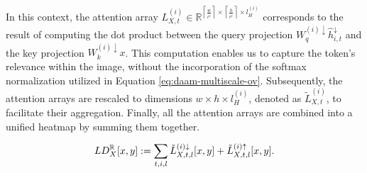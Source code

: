 In this context, the attention array $L_{X,t}^{(i)}\in \mathbb{R}^{\left \lceil \frac{w}{c^i} \right \rceil \times \left \lceil \frac{h}{c^i} \right \rceil \times l_{H}^{(i)}}$ corresponds to the result of computing the dot product between the query projection $W_q^{(i)\downarrow} \hat{h}_{i, t}^{\downarrow}$ and the key projection $W_k^{(i)\downarrow} x$. This computation enables us to capture the token's relevance within the image, without the incorporation of the softmax normalization utilized in Equation \ref{eq:daam-multiscale-ov}.
Subsequently, the attention arrays are rescaled to dimensions $w \times h \times l_{H}^{(i)}$, denoted as $\tilde{L}_{X,t}^{(i)}$, to facilitate their aggregation. Finally, all the attention arrays are combined into a unified heatmap by summing them together.

\begin{equation}
\label{eq:daam-summing-ov-linear}
    {LD}_{X}^{\mathbb{R}}[x, y] := \sum_{t, i, l} \Tilde{L}_{X, t, l}^{(i) \downarrow}[x,y] + \Tilde{L}_{X, t, l}^{(i) \uparrow}[x,y].
\end{equation}


